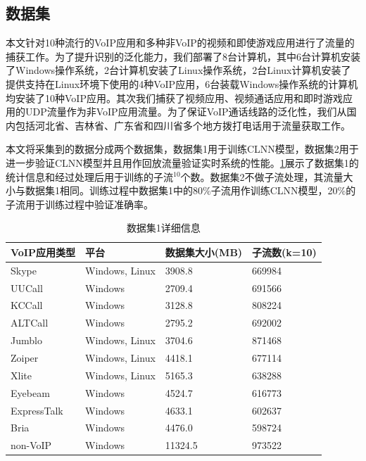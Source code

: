 \subsection{数据集}
本文针对10种流行的VoIP应用和多种非VoIP的视频和即使游戏应用进行了流量的捕获工作。为了提升识别的泛化能力，我们部署了8台计算机，其中6台计算机安装了Windows操作系统，2台计算机安装了Linux操作系统，2台Linux计算机安装了提供支持在Linux环境下使用的4种VoIP应用，6台装载Windows操作系统的计算机均安装了10种VoIP应用。其次我们捕获了视频应用、视频通话应用和即时游戏应用的UDP流量作为非VoIP应用流量。为了保证VoIP通话线路的泛化性，我们从国内包括河北省、吉林省、广东省和四川省多个地方拨打电话用于流量获取工作。

本文将采集到的数据分成两个数据集，数据集1用于训练CLNN模型，数据集2用于进一步验证CLNN模型并且用作回放流量验证实时系统的性能。\ref{tab:traffic}展示了数据集1的统计信息和经过处理后用于训练的子流$^{10}$个数。数据集2不做子流处理，其流量大小与数据集1相同。训练过程中数据集1中的80\%子流用作训练CLNN模型，20\%的子流用于训练过程中验证准确率。

\begin{table}[htbp]
  \caption{数据集1详细信息}
  \label{tab:traffic}
  \centering
  \begin{tabular}{l l l l}
    \hline
    \textbf{VoIP应用类型} & \textbf{平台} & \textbf{数据集大小(MB)}& \textbf{子流数(k=10)}\\
    \hline
    Skype      & Windows, Linux  & 3908.8  &  669984  \\
    UUCall      & Windows  & 2709.4  &  691566  \\
    KCCall      & Windows  & 3128.8  &  808224  \\
    ALTCall      & Windows  & 2795.2  &  692002  \\
    Jumblo      & Windows, Linux  & 3704.6  &  871468  \\
    Zoiper      & Windows, Linux  & 4418.1  &  677114  \\
    Xlite      & Windows, Linux  & 5165.3  &  638288  \\
    Eyebeam      & Windows  & 4524.7  &  616773  \\
    ExpressTalk      & Windows  & 4633.1  &  602637  \\
    Bria      & Windows  & 4476.0  &  598724  \\
    non-VoIP      & Windows  & 11324.5  &  973522  \\
    \hline
  \end{tabular}
\end{table}

